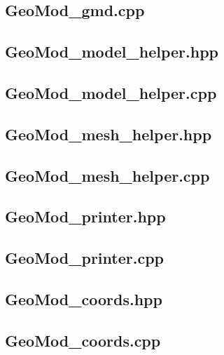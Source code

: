 \documentclass[a4paper, 12pt]{article}
\begin{document}
\subsection{GeoMod\_gmd.cpp} \label{subsec:gmd_cpp}


\subsection{GeoMod\_model\_helper.hpp} \label{subsec:model_hpp}

\subsection{GeoMod\_model\_helper.cpp} \label{subsec:model_cpp}


\subsection{GeoMod\_mesh\_helper.hpp} \label{subsec:mesh_hpp}

\subsection{GeoMod\_mesh\_helper.cpp} \label{subsec:mesh_cpp}


\subsection{GeoMod\_printer.hpp} \label{subsec:printer_hpp}

\subsection{GeoMod\_printer.cpp} \label{subsec:printer_cpp}


\subsection{GeoMod\_coords.hpp} \label{subsec:coords_hpp}

\subsection{GeoMod\_coords.cpp} \label{subsec:coords_cpp}

\end{document}
